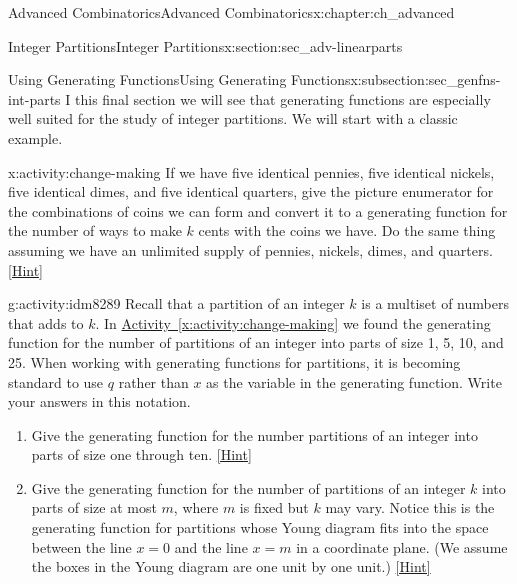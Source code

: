 \documentclass[oneside,10pt,]{book}
\numberwithin{equation}{chapter}
\begin{document}
\begin{chapterptx}{Advanced Combinatorics}{}{Advanced Combinatorics}{}{}{x:chapter:ch_advanced}
\begin{sectionptx}{Integer Partitions}{}{Integer Partitions}{}{}{x:section:sec_adv-linearparts}
%
\begin{subsectionptx}{Using Generating Functions}{}{Using Generating Functions}{}{}{x:subsection:sec_genfns-int-parts}
I this final section we will see that generating functions are especially well suited for the study of integer partitions.  We will start with a classic example.%
\begin{activity}{}{x:activity:change-making}%
If we have five identical pennies, five identical nickels, five identical dimes, and five identical quarters, give the picture enumerator for the combinations of coins we can form and convert it to a generating function for the number of ways to make \(k\) cents with the coins we have. Do the same thing assuming we have an unlimited supply of pennies, nickels, dimes, and quarters.%
\space\hspace*{0pt}\hfill{\tiny\hyperlink{g:hint:idm8271-back}{[Hint]}}\end{activity}
\begin{activity}{}{g:activity:idm8289}%
Recall that a partition of an integer \(k\) is a multiset of numbers that adds to \(k\). In \hyperref[x:activity:change-making]{Activity~\ref{x:activity:change-making}} we found the generating function for the number of partitions of an integer into parts of size 1, 5, 10, and 25. When working with generating functions for partitions, it is becoming standard to use \(q\) rather than \(x\) as the variable in the generating function.  Write your answers in this notation.\footnotemark{}%
\begin{enumerate}[font=\bfseries,label=(\alph*),ref=\alph*]
\item{}Give the generating function for the number partitions of an integer into parts of size one through ten.%
\space\hspace*{0pt}\hfill{\tiny\hyperlink{g:hint:idm8302-back}{[Hint]}}\item\label{x:task:largestpartatmostm}Give the generating function for the number of partitions of an integer \(k\) into parts of size at most \(m\), where \(m\) is fixed but \(k\) may vary. Notice this is the generating function for partitions whose Young diagram fits into the space between the line \(x=0\) and the line \(x=m\) in a coordinate plane. (We assume the boxes in the Young diagram are one unit by one unit.)%
\space\hspace*{0pt}\hfill{\tiny\hyperlink{g:hint:idm8316-back}{[Hint]}}\end{enumerate}
\end{activity}
%

\end{subsectionptx}
\end{sectionptx}
\end{chapterptx}
\end{document}
